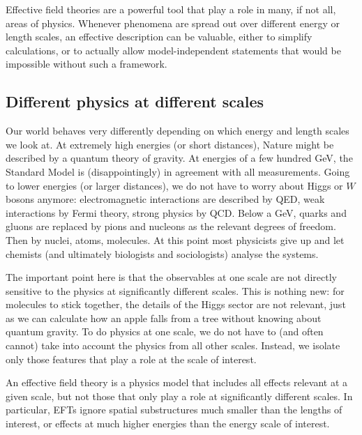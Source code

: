 Effective field theories are a powerful tool that play a role in many,
if not all, areas of physics. Whenever phenomena are spread out over
different energy or length scales, an effective description can be
valuable, either to simplify calculations, or to actually allow
model-independent statements that would be impossible without such a
framework.



\subsection{Different physics at different scales}
\label{sec:foundations_scales}

Our world behaves very differently depending on which energy and
length scales we look at. At extremely high energies (or short
distances), Nature might be described by a quantum theory of
gravity. At energies of a few hundred GeV, the Standard Model is
(disappointingly) in agreement with all measurements. Going to lower
energies (or larger distances), we do not have to worry about Higgs or
$W$ bosons anymore: electromagnetic interactions are described by QED,
weak interactions by Fermi theory, strong physics by QCD. Below a GeV,
quarks and gluons are replaced by pions and nucleons as the relevant
degrees of freedom. Then by nuclei, atoms, molecules. At this point
most physicists give up and let chemists (and ultimately biologists
and sociologists) analyse the systems.

The important point here is that the observables at one scale are not
directly sensitive to the physics at significantly different
scales. This is nothing new: for molecules to stick together, the
details of the Higgs sector are not relevant, just as we can calculate how
an apple falls from a tree without knowing about quantum gravity. To
do physics at one scale, we do not have to (and often cannot) take
into account the physics from all other scales. Instead, we isolate
only those features that play a role at the scale of interest.

An effective field theory is a physics model that includes all effects
relevant at a given scale, but not those that only play a role at
significantly different scales. In particular, EFTs ignore spatial
substructures much smaller than the lengths of interest, or effects at
much higher energies than the energy scale of interest.

